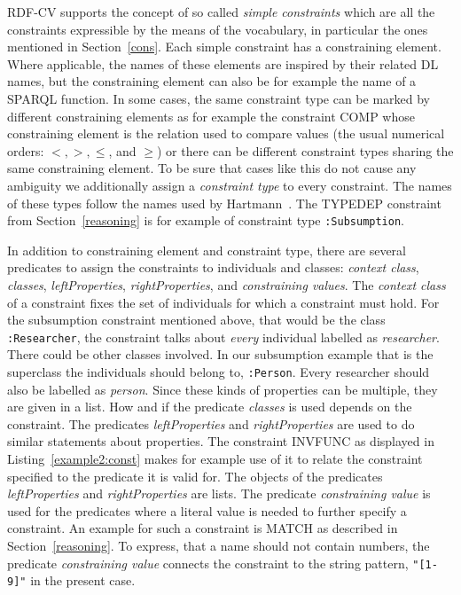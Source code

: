 RDF-CV supports the concept of so called \emph{simple constraints} which are all the constraints expressible by the means of the vocabulary, in particular 
the ones mentioned in Section~\ref{cons}. Each simple constraint has a constraining element. Where applicable, the names of these elements are inspired by their related 
DL names, but the constraining element can also be for example the name of a SPARQL function. In some cases, the same constraint type 
can be marked by different constraining elements as for example the constraint COMP whose constraining element is the relation 
used to compare values 
(\eg the usual numerical orders: $<,>,\leq$, and $\geq$) or there can be different constraint types sharing the same constraining element.
To be sure that cases like this do not cause any ambiguity we additionally assign a \emph{constraint type} to every constraint. 
The names of these types follow the names used by Hartmann~\cite[appendix]{hartmann2016}. 
The TYPEDEP constraint from Section~\ref{reasoning} is for example of constraint type \texttt{:Subsumption}.

In addition to constraining element and constraint type, there are several predicates to assign the constraints to individuals and classes: \emph{context class}, 
\emph{classes}, 
\emph{leftProperties}, 
\emph{rightProperties}, and \emph{constraining values}.
The \emph{context class} of a constraint fixes the set of individuals for which a constraint must hold. For the subsumption constraint mentioned above, that would be 
the class \texttt{:Researcher}, the constraint talks about \emph{every} individual labelled as \emph{researcher}. 
There could be other classes involved. In our subsumption example that is the superclass the  
individuals should belong to, \texttt{:Person}. Every researcher should also be labelled as \emph{person}. %
Since these kinds of properties can be multiple, 
they are given in a
list. How and if the predicate  \emph{classes} is used depends on the constraint.
The predicates \emph{leftProperties} and \emph{rightProperties} are used to do similar statements about properties. The constraint INVFUNC as displayed in 
Listing~\ref{example2:const} makes for example use of it to 
relate the constraint specified to the predicate it is valid for. The objects of the predicates \emph{leftProperties} and \emph{rightProperties} are lists. The predicate 
\emph{constraining value}
 is used for the predicates where a literal value is needed to further specify a constraint. An example for such a constraint is MATCH as described in Section~\ref{reasoning}. To 
 express, that a name should not contain numbers, the predicate \emph{constraining value} connects the constraint to the string pattern,
 \texttt{"[1-9]"} in the present case. 



